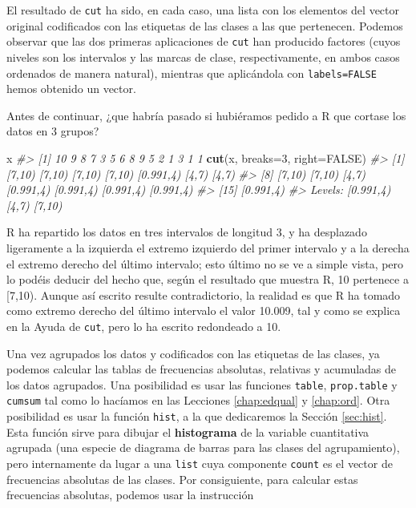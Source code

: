 \documentclass[
]{book}
\newenvironment{Shaded}{\begin{snugshade}}{\end{snugshade}}
\newcommand{\CommentTok}[1]{\textcolor[rgb]{0.56,0.35,0.01}{\textit{#1}}}
\newcommand{\DataTypeTok}[1]{\textcolor[rgb]{0.13,0.29,0.53}{#1}}
\newcommand{\DecValTok}[1]{\textcolor[rgb]{0.00,0.00,0.81}{#1}}
\newcommand{\KeywordTok}[1]{\textcolor[rgb]{0.13,0.29,0.53}{\textbf{#1}}}
\newcommand{\NormalTok}[1]{#1}
\newcommand{\OtherTok}[1]{\textcolor[rgb]{0.56,0.35,0.01}{#1}}
\theoremstyle{definition}
\theoremstyle{definition}
\theoremstyle{definition}
\theoremstyle{remark}
\begin{document}
El resultado de \texttt{cut} ha sido, en cada caso, una lista con los elementos del vector original codificados con las etiquetas de las clases a las que pertenecen. Podemos observar que las dos primeras aplicaciones de \texttt{cut} han producido factores (cuyos niveles son los intervalos y las marcas de clase, respectivamente, en ambos casos ordenados de manera natural), mientras que aplicándola con \texttt{labels=FALSE} hemos obtenido un vector.

Antes de continuar, ¿que habría pasado si hubiéramos pedido a R que cortase los datos en 3 grupos?

\begin{Shaded}
\begin{Highlighting}[]
\NormalTok{x}
\CommentTok{\#\textgreater{}  [1] 10  9  8  7  3  5  6  8  9  5  2  1  3  1  1}
\KeywordTok{cut}\NormalTok{(x, }\DataTypeTok{breaks=}\DecValTok{3}\NormalTok{, }\DataTypeTok{right=}\OtherTok{FALSE}\NormalTok{)}
\CommentTok{\#\textgreater{}  [1] [7,10)    [7,10)    [7,10)    [7,10)    [0.991,4) [4,7)     [4,7)    }
\CommentTok{\#\textgreater{}  [8] [7,10)    [7,10)    [4,7)     [0.991,4) [0.991,4) [0.991,4) [0.991,4)}
\CommentTok{\#\textgreater{} [15] [0.991,4)}
\CommentTok{\#\textgreater{} Levels: [0.991,4) [4,7) [7,10)}
\end{Highlighting}
\end{Shaded}

R ha repartido los datos en tres intervalos de longitud 3, y ha desplazado ligeramente a la izquierda el extremo izquierdo del primer intervalo y a la derecha el extremo derecho del último intervalo; esto último no se ve a simple vista, pero lo podéis deducir del hecho que, según el resultado que muestra R, 10 pertenece a {[}7,10). Aunque así escrito resulte contradictorio, la realidad es que R ha tomado como extremo derecho del último intervalo el valor 10.009, tal y como se explica en la Ayuda de \texttt{cut}, pero lo ha escrito redondeado a 10.

Una vez agrupados los datos y codificados con las etiquetas de las clases, ya podemos calcular las tablas de frecuencias absolutas, relativas y acumuladas de los datos agrupados. Una posibilidad es usar las funciones \texttt{table}, \texttt{prop.table} y \texttt{cumsum} tal como lo hacíamos en las Lecciones \ref{chap:edqual} y \ref{chap:ord}. Otra posibilidad es usar la función \texttt{hist}, a la que dedicaremos la Sección \ref{sec:hist}. Esta función sirve para dibujar el \textbf{histograma} de la variable cuantitativa agrupada (una especie de diagrama de barras para las clases del agrupamiento), pero internamente da lugar a una \texttt{list} cuya componente \texttt{count} es el vector de frecuencias absolutas de las clases. Por consiguiente, para calcular estas frecuencias absolutas, podemos usar la instrucción
\end{document}

